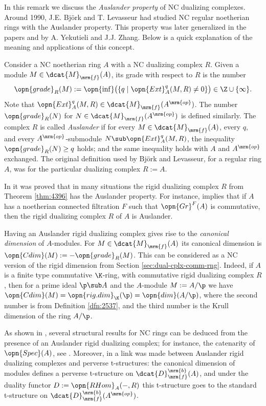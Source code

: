 \begin{rem} \label{rem:3821}
In this remark we discuss the {\em Auslander property} of NC dualizing 
complexes. Around 1990, J.E. Bj\"ork \cite{Bjo} and T. Levasseur \cite{Lev}  
had studied NC regular noetherian rings with the Auslander property. This 
property was later generalized in the papers \cite{Ye2.5}
and \cite{YeZh1} by A. Yekutieli and J.J. Zhang. Below is a quick explanation 
of the meaning and applications of this concept. 

Consider a NC noetherian ring $A$ with a NC dualizing complex $R$. 
Given a module $M \in \dcat{M}_{\mrm{f}}(A)$, its grade with respect to $R$ is 
the number 
\[ \opn{grade}_R(M) := 
\opn{\inf} \bigl( \{ q \mid \opn{Ext}^q_A(M, R) \neq 0 \} \bigr) \in 
\Z \cup  \{ \infty \} . \]
Note that $\opn{Ext}^q_A(M, R) \in \dcat{M}_{\mrm{f}}(A^{\mrm{op}})$.
The number $\opn{grade}_R(N)$ for $N \in \dcat{M}_{\mrm{f}}(A^{\mrm{op}})$
is defined similarly. The complex $R$ is called {\em Auslander} if for every 
$M \in \dcat{M}_{\mrm{f}}(A)$, every $q$, and 
every $A^{\mrm{op}}$-submodule 
$N \sub \opn{Ext}^q_A(M, R)$, the inequality $\opn{grade}_R(N) \geq q$
holds; and the same inequality holds with $A$ and $A^{\mrm{op}}$ 
exchanged. The original definition used by Bj\"ork and Levasseur, for a regular 
ring $A$, was for the particular dualizing complex $R := A$. 

In \cite{YeZh1} it was proved that in many situations the rigid dualizing 
complex $R$ from Theorem \ref{thm:4396} has the Auslander property. For 
instance, \cite[Theorem 0.7]{YeZh1} implies that if $A$ has a noetherian 
connected filtration $F$ such that $\opn{Gr}^F(A)$ is commutative, then the 
rigid dualizing complex $R$ of $A$ is Auslander. 

Having an Auslander rigid dualizing complex gives rise to the {\em canonical 
dimension} of $A$-modules. For $M \in \dcat{M}_{\mrm{f}}(A)$ its canonical 
dimension is $\opn{Cdim}(M) := - \opn{grade}_R(M)$.
This can be considered as a NC version of the rigid dimension from 
Section \ref{sec:dual-cplx-comm-rng}.
Indeed, if $A$ is a finite type commutative $\K$-ring, with commutative rigid 
dualizing complex $R$, then for a prime ideal $\p \sub A$ and the $A$-module 
$M := A / \p$ we have 
$\opn{Cdim}(M) = \opn{rig{.}dim}_{\K}(\p) = \opn{dim}(A / \p)$,
where the second number is from Definition \ref{dfn:2537}, and the 
third number is the Krull dimension of the ring $A / \p$. 

As shown in \cite{YeZh1}, several structural results for NC rings 
can be deduced from the presence of an Auslander rigid dualizing complex; for 
instance, the catenarity of $\opn{Spec}(A)$, see \cite[Theorem 0.1]{YeZh1}.
Moreover, in \cite[Section 7]{YeZh2.5} a link was made 
between Auslander rigid dualizing 
complexes and perverse t-structures: the canonical dimension of modules defines 
a perverse t-structure on $\dcat{D}^{\mrm{b}}_{\mrm{f}}(A)$, and under the 
duality functor $D := \opn{RHom}_A(-, R)$ this t-structure goes to the standard 
t-structure on $\dcat{D}^{\mrm{b}}_{\mrm{f}}(A^{\mrm{op}})$. 
\end{rem}





